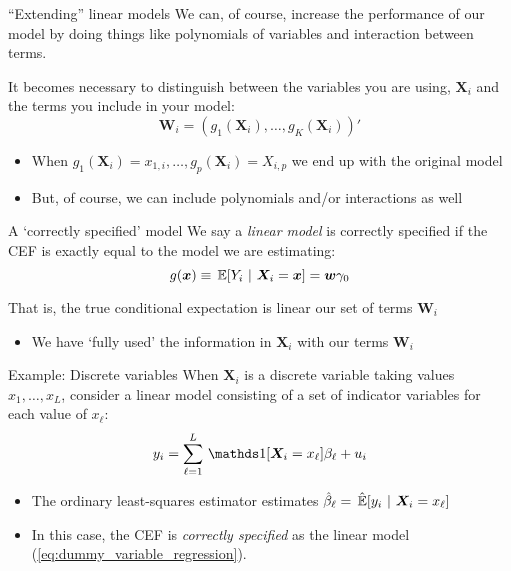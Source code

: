 \documentclass[aspectratio=169,t,11pt,table]{beamer}
\begin{document}
\begin{frame}{``Extending'' linear models}
  We can, of course, increase the performance of our model by doing things like polynomials of variables and interaction between terms.

  \bigskip
  It becomes necessary to distinguish between the variables you are using, $\bm{X}_i$ and the terms you include in your model:
  $$
    \bm{W}_i = \left( g_1(\bm{X}_i), \dots, g_K(\bm{X}_i) \right)'
  $$

  \medskip
  \begin{itemize}
    \item When $g_1(\bm{X}_i) = x_{1, i}, \dots, g_p(\bm{X}_i) = X_{i, p}$ we end up with the original model
    
    \item But, of course, we can include polynomials and/or interactions as well
  \end{itemize}
\end{frame}

\begin{frame}{A `correctly specified' model}
  We say a \emph{linear model} is \alert{correctly specified} if the CEF is exactly equal to the model we are estimating:
  $$
    g(\bm{x}) \equiv \expec{Y_i}{\bm{X}_i = \bm{x}}= \bm{w} \gamma_0
  $$

  \bigskip
  That is, the true conditional expectation is linear our set of terms $\bm{W}_i$
  \begin{itemize}
    \item We have `fully used' the information in $\bm{X}_i$ with our terms $\bm{W}_i$
  \end{itemize}
\end{frame}

\begin{frame}{Example: Discrete variables}
  When $\bm{X}_i$ is a discrete variable taking values $x_1, \dots, x_L$, consider a linear model consisting of a set of \alert{indicator variables} for each value of $x_\ell$:
  \begin{equation}\label{eq:dummy_variable_regression}
    y_i = \sum_{\ell = 1}^L \one{\bm{X}_i = x_\ell} \beta_\ell + u_i
  \end{equation}
  \pause
  \begin{itemize}
    \item The ordinary least-squares estimator estimates $\hat{\beta}_{\ell} = \expechat{y_i}{\bm{X}_i = x_\ell}$

    \pause
    \item In this case, the CEF is \emph{correctly specified} as the linear model (\ref{eq:dummy_variable_regression}).
  \end{itemize}
\end{frame}
\end{document}
